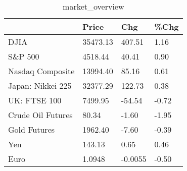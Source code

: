 \documentclass{article}%
\begin{document}
%


\begin{table}[htbp]%
\caption{market\_overview}%
\centering%
\begin{adjustbox}{width=1\textwidth}%
\begin{tabular}{llll}
\toprule
                  &    Price &     Chg &  \%Chg \\
\midrule
             DJIA & 35473.13 &  407.51 &  1.16 \\
          S\&P 500 &  4518.44 &   40.41 &  0.90 \\
 Nasdaq Composite & 13994.40 &   85.16 &  0.61 \\
Japan: Nikkei 225 & 32377.29 &  122.73 &  0.38 \\
     UK: FTSE 100 &  7499.95 &  -54.54 & -0.72 \\
Crude Oil Futures &    80.34 &   -1.60 & -1.95 \\
     Gold Futures &  1962.40 &   -7.60 & -0.39 \\
              Yen &   143.13 &    0.65 &  0.46 \\
             Euro &   1.0948 & -0.0055 & -0.50 \\
\bottomrule
\end{tabular}
%
\end{adjustbox}%
\end{table}

%
\end{document}
